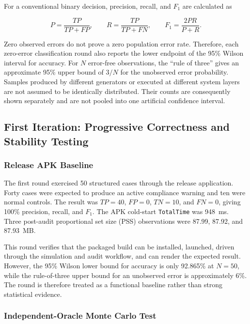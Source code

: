 For a conventional binary decision, precision, recall, and \(F_1\) are calculated as

\begin{equation}
P=\frac{TP}{TP+FP}, \qquad
R=\frac{TP}{TP+FN}, \qquad
F_1=\frac{2PR}{P+R}.
\end{equation}

Zero observed errors do not prove a zero population error rate. Therefore, each zero-error classification round also reports the lower endpoint of the 95\% Wilson interval for accuracy. For \(N\) error-free observations, the ``rule of three'' gives an approximate 95\% upper bound of \(3/N\) for the unobserved error probability. Samples produced by different generators or executed at different system layers are not assumed to be identically distributed. Their counts are consequently shown separately and are not pooled into one artificial confidence interval.

\subsection{First Iteration: Progressive Correctness and Stability Testing}

\subsubsection{Release APK Baseline}

The first round exercised 50 structured cases through the release application. Forty cases were expected to produce an active compliance warning and ten were normal controls. The result was \(TP=40\), \(FP=0\), \(TN=10\), and \(FN=0\), giving 100\% precision, recall, and \(F_1\). The APK cold-start \texttt{TotalTime} was 948~ms. Three post-audit proportional set size (PSS) observations were 87.99, 87.92, and 87.93~MB.

This round verifies that the packaged build can be installed, launched, driven through the simulation and audit workflow, and can render the expected result. However, the 95\% Wilson lower bound for accuracy is only 92.865\% at \(N=50\), while the rule-of-three upper bound for an unobserved error is approximately 6\%. The round is therefore treated as a functional baseline rather than strong statistical evidence.

\subsubsection{Independent-Oracle Monte Carlo Test}

